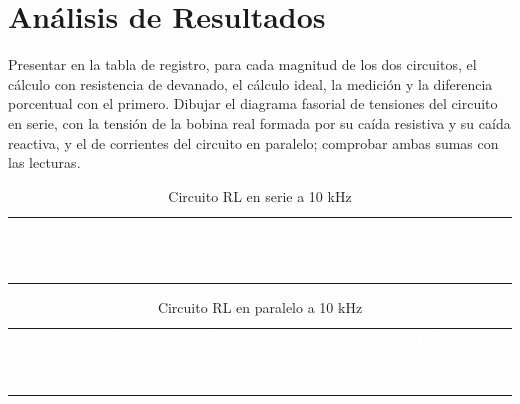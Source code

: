 \documentclass[12pt]{article}
\begin{document}
\section{Análisis de Resultados}\label{sec:analisis}
Presentar en la tabla de registro, para cada magnitud de los dos circuitos, el cálculo con resistencia de devanado, el cálculo ideal, la medición y la diferencia porcentual con el primero.
\lineablanco
Dibujar el diagrama fasorial de tensiones del circuito en serie, con la tensión de la bobina real formada por su caída resistiva y su caída reactiva, y el de corrientes del circuito en paralelo; comprobar ambas sumas con las lecturas.
\begin{table}[H]
  \centering
  \caption{Circuito RL en serie a 10 kHz}
  \label{tab:registro-1}
  \begin{tabularx}{\linewidth}{>{\raggedright\arraybackslash}X>{\raggedright\arraybackslash}X>{\raggedright\arraybackslash}X>{\raggedright\arraybackslash}X>{\raggedright\arraybackslash}X>{\raggedright\arraybackslash}X}
    \rowcolor{iubnavy} \textcolor{white}{\textbf{Magnitud}} & \textcolor{white}{\textbf{Cálculo con RW}} & \textcolor{white}{\textbf{Cálculo ideal}} & \textcolor{white}{\textbf{Medido}} & \textcolor{white}{\textbf{Unidad}} & \textcolor{white}{\textbf{Diferencia (\%)}} \\
    \rule{0pt}{0.8cm} & & & & & \\
    \rowcolor{iubfondogris} \rule{0pt}{0.8cm} & & & & & \\
    \rule{0pt}{0.8cm} & & & & & \\
    \rowcolor{iubfondogris} \rule{0pt}{0.8cm} & & & & & \\
    \bottomrule
  \end{tabularx}
\end{table}
\begin{table}[H]
  \centering
  \caption{Circuito RL en paralelo a 10 kHz}
  \label{tab:registro-2}
  \begin{tabularx}{\linewidth}{>{\raggedright\arraybackslash}X>{\raggedright\arraybackslash}X>{\raggedright\arraybackslash}X>{\raggedright\arraybackslash}X>{\raggedright\arraybackslash}X>{\raggedright\arraybackslash}X}
    \rowcolor{iubnavy} \textcolor{white}{\textbf{Magnitud}} & \textcolor{white}{\textbf{Cálculo con RW}} & \textcolor{white}{\textbf{Cálculo ideal}} & \textcolor{white}{\textbf{Medido}} & \textcolor{white}{\textbf{Unidad}} & \textcolor{white}{\textbf{Diferencia (\%)}} \\
    \rule{0pt}{0.8cm} & & & & & \\
    \rowcolor{iubfondogris} \rule{0pt}{0.8cm} & & & & & \\
    \rule{0pt}{0.8cm} & & & & & \\
    \rowcolor{iubfondogris} \rule{0pt}{0.8cm} & & & & & \\
    \bottomrule
  \end{tabularx}
\end{table}
\end{document}
